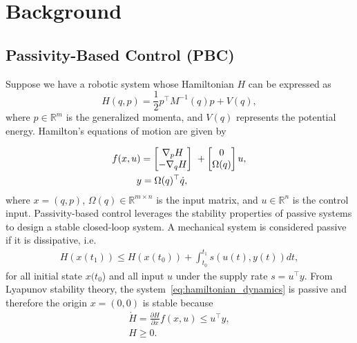 
\section{Background}

\subsection{Passivity-Based Control (PBC)}
\label{ssec:pbc}

Suppose we have a robotic system whose Hamiltonian $H$ can be expressed as
%
\begin{equation}
    H(q,p) = \frac{1}{2} p^\top M^{-1}(q) p + V(q),
    \label{eq:system_hamiltonian}
\end{equation}
%
where $p \in \mathbb{R}^m$ is the generalized momenta, and $V(q)$ represents the
potential energy. Hamilton's equations of motion are given by

\begin{align}
    \begin{split}  
      f(x, u) &= \bmat{\nabla_pH \\ -\nabla_qH}\ + \bmat{0 \\ \Omega(q)}u, \\
      &\hspace{-0.15cm} y = \Omega(q)^\top \dot{q},
    \end{split}
    \label{eq:hamiltonian_dynamics}
\end{align}
\noindent where $x = (q, p)$, $\Omega(q) \in \mathbb{R}^{m \times n}$ is
the input matrix, and $u \in \mathbb{R}^{n}$ is the control input.
%
%
Passivity-based control leverages the stability properties of passive systems to
design a stable closed-loop system.
%
A mechanical system is considered passive if it is dissipative, i.e.
\begin{align}
  H(x(t_1)) \leq H(x(t_0)) + \int_{t_0}^{t_1} s(u(t), y(t)) dt,
\end{align}
\noindent for all initial state $x(t_0$) and all input $u$ under the
supply rate $s = u^\top y$.
%
From Lyapunov stability theory, the system~\eqref{eq:hamiltonian_dynamics} is
passive and therefore the origin $x = (0, 0)$ is stable because 
\begin{equation*}
  \begin{gathered}
    \dot{H} = \frac{\partial H}{\partial x} f(x, u) \leq u^\top y, \\
    H \geq 0.
  \end{gathered}
\end{equation*}

